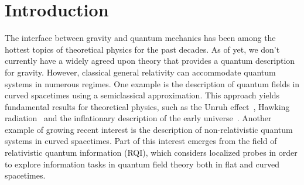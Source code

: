 \documentclass[prd,twocolumn,superscriptaddress,floatfix,amsmath,amssymb,amsfonts,longbibliography,nofootinbib]{revtex4-1}
\begin{document}


\maketitle

\section{Introduction}

The interface between gravity and quantum mechanics has been among the hottest topics of theoretical physics for the past decades. As of yet, we don't currently have a widely agreed upon theory that provides a quantum description for gravity. However, classical general relativity can accommodate quantum systems in numerous regimes. One example is the description of quantum fields in curved spacetimes using a semiclassical approximation. This approach yields fundamental results for theoretical physics, such as the Unruh effect~\cite{fullingUnruhEffect,Unruh-Wald,Unruh1976,Schlicht,waitUnruh}, Hawking radiation~\cite{HawkingRadiation,Davies1974,HawkingGibons} and the inflationary description of the early universe~\cite{inflation}. Another example of growing recent interest is the description of non-relativistic quantum systems in curved spacetimes. Part of this interest emerges from the field of relativistic quantum information (RQI), which considers localized probes in order to explore information tasks in quantum field theory both in flat and curved spacetimes.
\end{document}
